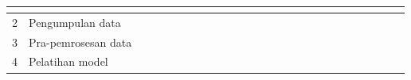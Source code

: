 \begin{table}[H]
{\begin{tabular}{|l|l|llllllllllllllllllllllll|}
    \multicolumn{1}{l|}{} &
    \multicolumn{1}{l|}{} &
    \multicolumn{1}{l|}{} &
    \multicolumn{1}{l|}{} &
    \multicolumn{1}{l|}{} &
    \multicolumn{1}{l|}{} &
    \multicolumn{1}{l|}{} &
    \multicolumn{1}{l|}{} &
    \multicolumn{1}{l|}{} &
     \\ \hline
  2 &
    Pengumpulan data &
    \multicolumn{1}{l|}{} &
    \multicolumn{1}{l|}{} &
    \multicolumn{1}{l|}{\cellcolor[HTML]{333333}} &
    \multicolumn{1}{l|}{\cellcolor[HTML]{333333}} &
    \multicolumn{1}{l|}{} &
    \multicolumn{1}{l|}{} &
    \multicolumn{1}{l|}{} &
    \multicolumn{1}{l|}{} &
    \multicolumn{1}{l|}{} &
    \multicolumn{1}{l|}{} &
    \multicolumn{1}{l|}{} &
    \multicolumn{1}{l|}{} &
    \multicolumn{1}{l|}{} &
    \multicolumn{1}{l|}{} &
    \multicolumn{1}{l|}{} &
    \multicolumn{1}{l|}{} &
    \multicolumn{1}{l|}{} &
    \multicolumn{1}{l|}{} &
    \multicolumn{1}{l|}{} &
    \multicolumn{1}{l|}{} &
    \multicolumn{1}{l|}{} &
    \multicolumn{1}{l|}{} &
    \multicolumn{1}{l|}{} &
     \\ \hline
  3 &
    Pra-pemrosesan data &
    \multicolumn{1}{l|}{} &
    \multicolumn{1}{l|}{} &
    \multicolumn{1}{l|}{} &
    \multicolumn{1}{l|}{} &
    \multicolumn{1}{l|}{\cellcolor[HTML]{333333}} &
    \multicolumn{1}{l|}{\cellcolor[HTML]{333333}} &
    \multicolumn{1}{l|}{\cellcolor[HTML]{333333}} &
    \multicolumn{1}{l|}{\cellcolor[HTML]{333333}} &
    \multicolumn{1}{l|}{\cellcolor[HTML]{333333}} &
    \multicolumn{1}{l|}{\cellcolor[HTML]{333333}} &
    \multicolumn{1}{l|}{} &
    \multicolumn{1}{l|}{} &
    \multicolumn{1}{l|}{} &
    \multicolumn{1}{l|}{} &
    \multicolumn{1}{l|}{} &
    \multicolumn{1}{l|}{} &
    \multicolumn{1}{l|}{} &
    \multicolumn{1}{l|}{} &
    \multicolumn{1}{l|}{} &
    \multicolumn{1}{l|}{} &
    \multicolumn{1}{l|}{} &
    \multicolumn{1}{l|}{} &
    \multicolumn{1}{l|}{} &
     \\ \hline
  4 &
    Pelatihan model &
    \multicolumn{1}{l|}{} &
    \multicolumn{1}{l|}{} &
    \multicolumn{1}{l|}{} &
    \multicolumn{1}{l|}{} &
    \multicolumn{1}{l|}{} &
    \multicolumn{1}{l|}{} &
    \multicolumn{1}{l|}{} &
    \multicolumn{1}{l|}{} &
    \multicolumn{1}{l|}{} &
    \multicolumn{1}{l|}{} &
    \multicolumn{1}{l|}{\cellcolor[HTML]{333333}} &
    \multicolumn{1}{l|}{\cellcolor[HTML]{333333}} &
    \multicolumn{1}{l|}{\cellcolor[HTML]{333333}} &
    \multicolumn{1}{l|}{\cellcolor[HTML]{333333}} &
    \multicolumn{1}{l|}{\cellcolor[HTML]{333333}} &
    \multicolumn{1}{l|}{\cellcolor[HTML]{333333}} &
    \multicolumn{1}{l|}{} &

\end{tabular}}
\end{table}
